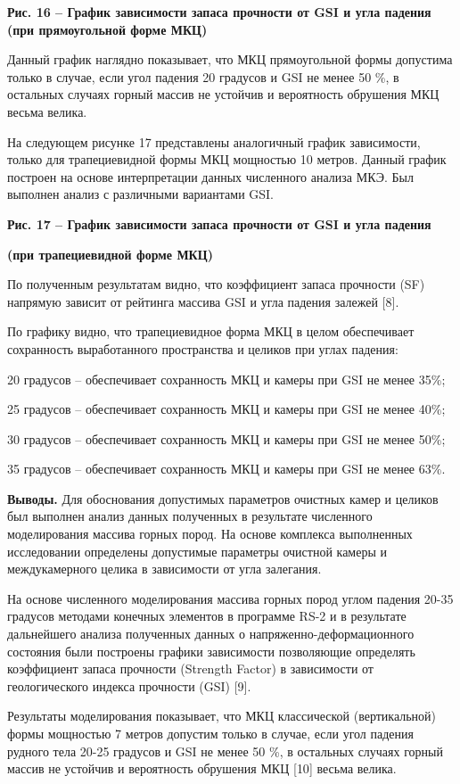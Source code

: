 {\bfseries Рис. 16 -- График зависимости запаса прочности от GSI и угла
падения (при прямоугольной форме МКЦ)}

Данный график наглядно показывает, что МКЦ прямоугольной формы допустима
только в случае, если угол падения 20 градусов и GSI не менее 50 \%, в
остальных случаях горный массив не устойчив и вероятность обрушения МКЦ
весьма велика.

На следующем рисунке 17 представлены аналогичный график зависимости,
только для трапециевидной формы МКЦ мощностью 10 метров. Данный график
построен на основе интерпретации данных численного анализа МКЭ. Был
выполнен анализ с различными вариантами GSI.

{\bfseries Рис. 17 -- График зависимости запаса прочности от GSI и угла
падения}

{\bfseries (при трапециевидной форме МКЦ)}

По полученным результатам видно, что коэффициент запаса прочности (SF)
напрямую зависит от рейтинга массива GSI и угла падения залежей {[}8{]}.

По графику видно, что трапециевидное форма МКЦ в целом обеспечивает
сохранность выработанного пространства и целиков при углах падения:

20 градусов -- обеспечивает сохранность МКЦ и камеры при GSI не менее
35\%;

25 градусов -- обеспечивает сохранность МКЦ и камеры при GSI не менее
40\%;

30 градусов -- обеспечивает сохранность МКЦ и камеры при GSI не менее
50\%;

35 градусов -- обеспечивает сохранность МКЦ и камеры при GSI не менее
63\%.

{\bfseries Выводы.} Для обоснования допустимых параметров очистных камер и
целиков был выполнен анализ данных полученных в результате численного
моделирования массива горных пород. На основе комплекса выполненных
исследовании определены допустимые параметры очистной камеры и
междукамерного целика в зависимости от угла залегания.

На основе численного моделирования массива горных пород углом падения
20-35 градусов методами конечных элементов в программе RS-2 и в
результате дальнейшего анализа полученных данных о
напряженно-деформационного состояния были построены графики зависимости
позволяющие определять коэффициент запаса прочности (Strength Factor) в
зависимости от геологического индекса прочности (GSI) {[}9{]}.

Результаты моделирования показывает, что МКЦ классической (вертикальной)
формы мощностью 7 метров допустим только в случае, если угол падения
рудного тела 20-25 градусов и GSI не менее 50 \%, в остальных случаях
горный массив не устойчив и вероятность обрушения МКЦ {[}10{]} весьма
велика.

